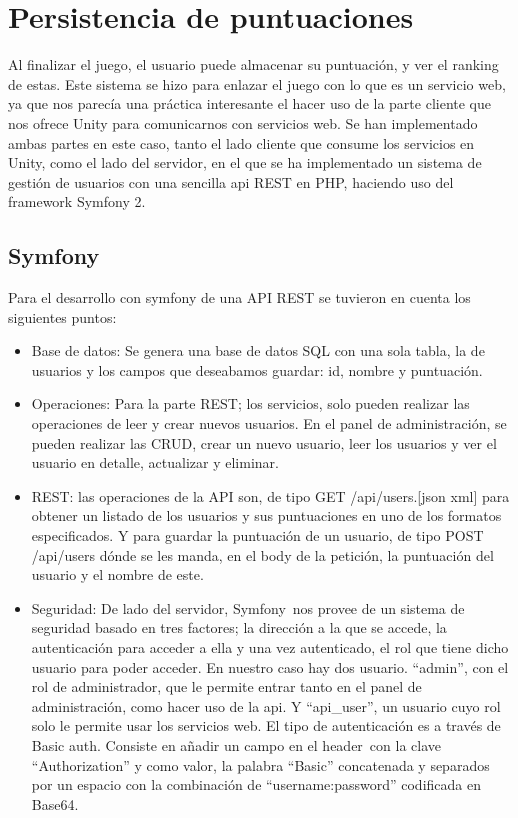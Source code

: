 \section{Persistencia de puntuaciones}
\label{cap4:sec:puntuaciones}

Al finalizar el juego, el usuario puede almacenar su puntuación, y ver el ranking de estas. Este sistema se hizo para enlazar el juego con lo que es un servicio web, ya que nos parecía una práctica interesante el hacer uso de la parte cliente que nos ofrece Unity para comunicarnos con servicios web. Se han implementado ambas partes en este caso, tanto el lado cliente que consume los servicios en Unity, como el lado del servidor, en el que se ha implementado un sistema de gestión de usuarios con una sencilla api REST en PHP, haciendo uso del framework Symfony 2.

\subsection{Symfony}
\label{cap4:sub:symfony}

Para el desarrollo con symfony de una API REST se tuvieron en cuenta los
siguientes puntos:

\begin{itemize}
\item{Base de datos: Se genera una base de datos SQL con una sola tabla, la de usuarios y los campos que deseabamos guardar: id, nombre y puntuación.}

\item{Operaciones: Para la parte REST; los servicios, solo pueden realizar las operaciones de leer y crear nuevos usuarios. En el panel de administración, se pueden realizar las CRUD, crear un nuevo usuario, leer los usuarios y ver el usuario en detalle, actualizar y eliminar.}

\item{REST: las operaciones de la API son, de tipo GET /api/users.{[}json \textbar{} xml{]} para obtener un listado de los usuarios y sus puntuaciones en uno de los formatos especificados. Y para guardar la puntuación de un usuario, de tipo POST /api/users dónde se les manda, en el body de la petición, la puntuación del usuario y el nombre de este.}

\item{Seguridad: De lado del servidor, Symfony~nos provee de un sistema de seguridad basado en tres factores; la dirección a la que se accede, la autenticación para acceder a ella y una vez autenticado, el rol que tiene dicho usuario para poder acceder. En nuestro caso hay dos usuario. ``admin'', con el rol de administrador, que le permite entrar tanto en el panel de administración, como hacer uso de la api. Y ``api\_user'', un usuario cuyo rol solo le permite usar los servicios web. El tipo de autenticación es a través de Basic auth. Consiste en añadir un campo en el header~con la clave ``Authorization'' y como valor, la palabra ``Basic'' concatenada y separados por un espacio con la combinación de ``username:password'' codificada en Base64.}
\end{itemize}

